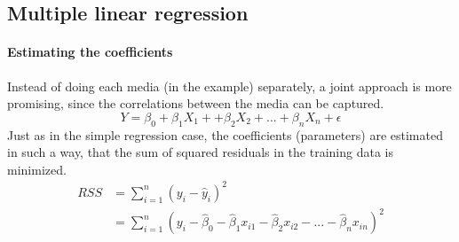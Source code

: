 \documentclass[../document.tex]{subfiles}
\begin{document}
	\subsection{Multiple linear regression}
	\paragraph{Estimating the coefficients}
	Instead of doing each media (in the example) separately, a joint approach is more promising, since the correlations between the media can be captured.
	\begin{equation}
		Y = \beta_{0}+\beta_{1}X_{1}++\beta_{2}X_{2}+...+\beta_{n}X_{n}+\epsilon
	\end{equation}
	Just as in the simple regression case, the coefficients (parameters) are estimated in such a way, that the sum of squared residuals in the training data is minimized.
	\begin{equation}
	\begin{split}
		RSS &= \sum_{i=1}^{n}(y_{i}-\hat{y}_{i})^2\\
			&= \sum_{i=1}^{n}(y_{i}-\hat{\beta}_{0}-\hat{\beta}_{1}x_{i1}-\hat{\beta}_{2}x_{i2}-...-\hat{\beta}_{n}x_{in})^2
	\end{split}
	\end{equation}
\end{document}
